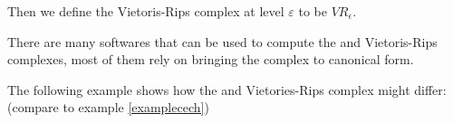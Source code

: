 Then we define the Vietoris-Rips complex at level $\varepsilon$ to be 
$VR_\epsilon$.



%

There are many softwares that can be used to compute the
{\Cech} and Vietoris-Rips complexes, most of them rely on bringing the complex to canonical form.


The following example shows how the {\Cech}
and Vietories-Rips complex might differ:
(compare to example \ref{examplecech})

